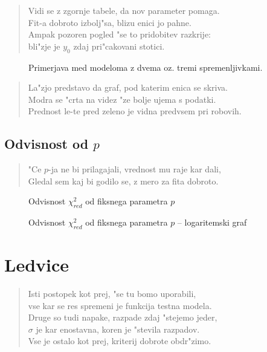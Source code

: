 \documentclass[a4paper,10pt]{article}
\begin{document}
\begin{verse}
Vidi se z zgornje tabele, da nov parameter pomaga. \\
Fit-a dobroto izbolj"sa, blizu enici jo pahne. \\
Ampak pozoren pogled "se to pridobitev razkrije: \\
bli"zje je $y_0$ zdaj pri"cakovani stotici. 
\end{verse}

\begin{figure}
 
  \caption{Primerjava med modeloma z dvema oz. tremi spremenljivkami. }
  \label{fig:farmacija}
\end{figure}

\begin{verse}
 La"zjo predstavo da graf, pod katerim enica se skriva. \\
 Modra se "crta na videz "ze bolje ujema s podatki. \\
 Prednost le-te pred zeleno je vidna predvsem pri robovih. 
\end{verse}

\subsection{Odvisnost od $p$}
\begin{verse}
 "Ce $p$-ja ne bi prilagajali, vrednost mu raje kar dali, \\
 Gledal sem kaj bi godilo se, z mero za fita dobroto. 
\end{verse}

\begin{figure}
 
\caption{Odvisnost $\chi^2_{red}$ od fiksnega parametra $p$ }
\label{fig:farmacija-hi}
\end{figure}

\begin{figure}
 
\caption{Odvisnost $\chi^2_{red}$ od fiksnega parametra $p$ -- logaritemski graf }
\label{fig:farmacija-hi}
\end{figure}

\section{Ledvice}
\begin{verse}
 Isti postopek kot prej, "se tu bomo uporabili, \\
 vse kar se res spremeni je funkcija testna modela. \\
 Druge so tudi napake, razpade zdaj "stejemo jeder, \\
 $\sigma$ je kar enostavna, koren je "stevila razpadov. \\
 Vse je ostalo kot prej, kriterij dobrote obdr"zimo. 
\end{verse}
\end{document}
